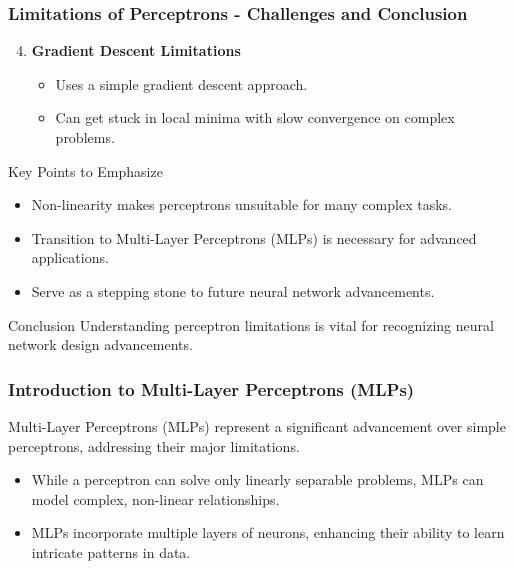 \documentclass[aspectratio=169]{beamer}
\begin{document}
\begin{frame}[fragile]
    \frametitle{Limitations of Perceptrons - Challenges and Conclusion}
    \begin{enumerate}
        \setcounter{enumi}{3}
        \item \textbf{Gradient Descent Limitations}
        \begin{itemize}
            \item Uses a simple gradient descent approach.
            \item Can get stuck in local minima with slow convergence on complex problems.
        \end{itemize}
    \end{enumerate}

    \begin{block}{Key Points to Emphasize}
        \begin{itemize}
            \item Non-linearity makes perceptrons unsuitable for many complex tasks.
            \item Transition to Multi-Layer Perceptrons (MLPs) is necessary for advanced applications.
            \item Serve as a stepping stone to future neural network advancements.
        \end{itemize}
    \end{block}

    \begin{block}{Conclusion}
        Understanding perceptron limitations is vital for recognizing neural network design advancements.
    \end{block}
\end{frame}

\begin{frame}[fragile]
    \frametitle{Introduction to Multi-Layer Perceptrons (MLPs)}
    Multi-Layer Perceptrons (MLPs) represent a significant advancement over simple perceptrons, addressing their major limitations. 
    \begin{itemize}
        \item While a perceptron can solve only linearly separable problems, MLPs can model complex, non-linear relationships.
        \item MLPs incorporate multiple layers of neurons, enhancing their ability to learn intricate patterns in data.
    \end{itemize}
\end{frame}
\end{document}
